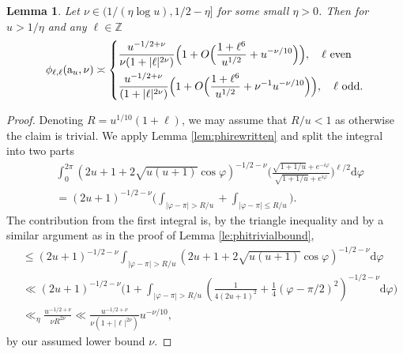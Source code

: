 \documentclass[12pt]{amsart}
\newtheorem{lemma}[theorem]{Lemma}
\theoremstyle{definition}
\theoremstyle{remark}
\numberwithin{equation}{section}
\newcommand{\Z}{{\mathbb Z}}
\newcommand{\1}{{\mathbf 1}}
\renewcommand{\a}{\mathrm{a}}
\renewcommand{\d}{\mathrm d}
\begin{document}
\begin{lemma}\label{lem:simplephiasymp}
Let $\nu \in (1/(\eta \log u),1/2-\eta]$ for some small $\eta>0$. Then for $u > 1/\eta$ and any $\ell \in \Z$
\begin{align*}
      \phi_{\ell,\ell}(\a_u,\nu)  \asymp  \begin{dcases}
          \frac{ u^{-1/2+\nu}}{\nu(1+|\ell|^{2\nu})} \Bigl(1+O\Bigl(\frac{1+\ell^{6}}{u^{1/2}} +   u^{-\nu/10}\Bigr)\Bigr), \quad \ell \text{ even} \\
            \frac{ u^{-1/2+\nu}}{(1+|\ell|^{2\nu})} \Bigl(1+O\Bigl(\frac{1+\ell^{6}}{u^{1/2}} +   \nu^{-1} u^{-\nu/10}\Bigr)\Bigr), \quad \ell \text{ odd}.
      \end{dcases}  
\end{align*}
\end{lemma}
\begin{proof}
Denoting  $R=u^{1/10}(1+\ell)$, we may assume that $R/u < 1$ as otherwise the claim is trivial. We apply Lemma \ref{lem:phirewritten} and split the integral into two parts
    \begin{align*}
       & \int_0^{2\pi } (2u+1 + 2\sqrt{u(u+1)} \cos \varphi)^{-1/2-\nu}    \bigg(\frac{\sqrt{1+1/u} + e^{-i\varphi}}{\sqrt{1+1/u} + e^{i\varphi}}\bigg)^{\ell/2} 
 \d \varphi  \\
 &=    (2u+1)^{-1/2-\nu} \bigg(\int_{|\varphi -\pi | > R/u} + \int_{|\varphi-\pi| \leq R/u}\bigg) .
    \end{align*}
The contribution from the first integral is, by the triangle inequality and by a similar argument as in the proof of Lemma \ref{le:phitrivialbound},
\begin{align*}
    &\leq  (2u+1)^{-1/2-\nu}\int_{|\varphi -\pi | > R/u}  (2u+1 + 2\sqrt{u(u+1)} \cos \varphi)^{-1/2-\nu} \d \varphi 
 \\
 &\ll (2u+1)^{-1/2-\nu} \bigg( 1 +  \int_{|\varphi -\pi| > R/u} (\tfrac{1}{4(2u+1)^2} +\tfrac{1}{4}(\varphi-\pi/2)^2)^{-1/2-\nu}   
\d \varphi  \bigg)  \\
& \ll_\eta  \frac{u^{-1/2+ \nu}}{ \nu R^{2\nu}}  \ll \frac{u^{-1/2+ \nu}}{ \nu (1+|\ell|^{2\nu})}  u^{-\nu/10} ,
\end{align*}
by our assumed lower bound $\nu$. 


\end{proof}
\end{document}
